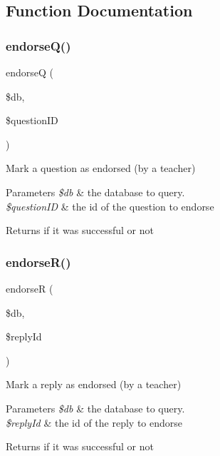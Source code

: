 \subsection{Function Documentation}
\mbox{\label{androidApi_8php_ad22fece50586ea491653f475dd202725}} 
\subsubsection{\texorpdfstring{endorse\+Q()}{endorseQ()}}
{\footnotesize\ttfamily endorseQ (\begin{DoxyParamCaption}\item[{}]{\$db,  }\item[{}]{\$question\+ID }\end{DoxyParamCaption})}



Mark a question as endorsed (by a teacher) 


\begin{DoxyParams}{Parameters}
{\em \$db} & the database to query. \\
\hline
{\em \$question\+ID} & the id of the question to endorse \\
\hline
\end{DoxyParams}
\begin{DoxyReturn}{Returns}
if it was successful or not 
\end{DoxyReturn}
\mbox{\label{androidApi_8php_a2a034b0443357e70cc4c590ccf0956bd}} 
\subsubsection{\texorpdfstring{endorse\+R()}{endorseR()}}
{\footnotesize\ttfamily endorseR (\begin{DoxyParamCaption}\item[{}]{\$db,  }\item[{}]{\$reply\+Id }\end{DoxyParamCaption})}



Mark a reply as endorsed (by a teacher) 


\begin{DoxyParams}{Parameters}
{\em \$db} & the database to query. \\
\hline
{\em \$reply\+Id} & the id of the reply to endorse \\
\hline
\end{DoxyParams}
\begin{DoxyReturn}{Returns}
if it was successful or not 
\end{DoxyReturn}
\mbox{\label{androidApi_8php_aac2880d8e0c5114faff40f5f80acb15d}} 

